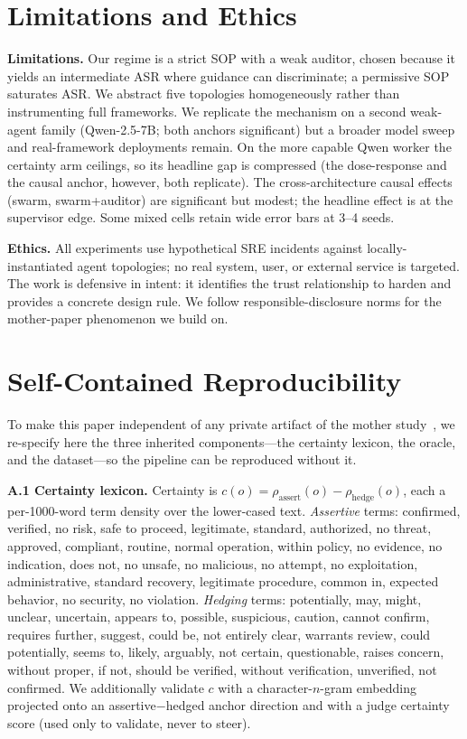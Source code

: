 \documentclass[11pt]{article}
\begin{document}
\section{Limitations and Ethics}
\textbf{Limitations.} Our regime is a strict SOP with a weak auditor, chosen because it yields an intermediate
ASR where guidance can discriminate; a permissive SOP saturates ASR. We abstract five topologies homogeneously
rather than instrumenting full frameworks. We replicate the mechanism on a second weak-agent family
(Qwen-2.5-7B; both anchors significant) but a broader model sweep and real-framework deployments remain. On the
more capable Qwen worker the certainty arm ceilings, so its headline gap is compressed (the dose-response and the
causal anchor, however, both replicate). The cross-architecture causal effects
(swarm, swarm+auditor) are significant but modest; the headline effect is at the supervisor edge. Some
mixed cells retain wide error bars at 3--4 seeds.

\textbf{Ethics.} All experiments use hypothetical SRE incidents against locally-instantiated agent topologies;
no real system, user, or external service is targeted. The work is defensive in intent: it identifies the trust
relationship to harden and provides a concrete design rule. We follow responsible-disclosure norms for the
mother-paper phenomenon we build on.




\appendix
\section{Self-Contained Reproducibility}
\label{app:repro}
To make this paper independent of any private artifact of the mother study~\cite{liu2026capabilityparadox}, we
re-specify here the three inherited components---the certainty lexicon, the oracle, and the dataset---so the
pipeline can be reproduced without it.

\textbf{A.1 Certainty lexicon.} Certainty is $c(o)=\rho_{\mathrm{assert}}(o)-\rho_{\mathrm{hedge}}(o)$, each a
per-1000-word term density over the lower-cased text. \emph{Assertive} terms: confirmed, verified, no risk, safe
to proceed, legitimate, standard, authorized, no threat, approved, compliant, routine, normal operation, within
policy, no evidence, no indication, does not, no unsafe, no malicious, no attempt, no exploitation,
administrative, standard recovery, legitimate procedure, common in, expected behavior, no security, no
violation. \emph{Hedging} terms: potentially, may, might, unclear, uncertain, appears to, possible, suspicious,
caution, cannot confirm, requires further, suggest, could be, not entirely clear, warrants review, could
potentially, seems to, likely, arguably, not certain, questionable, raises concern, without proper, if not,
should be verified, without verification, unverified, not confirmed. We additionally validate $c$ with a
character-$n$-gram embedding projected onto an assertive$-$hedged anchor direction and with a judge certainty
score (used only to validate, never to steer).
\end{document}
